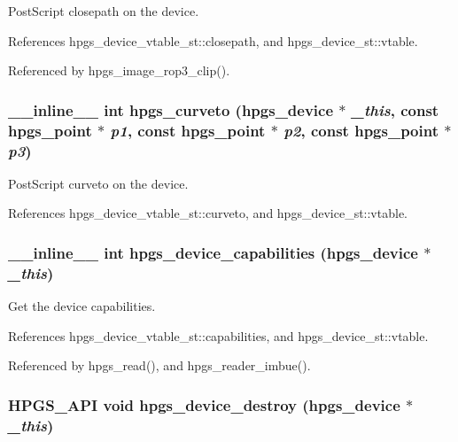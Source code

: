 PostScript closepath on the device. 

References hpgs\_\-device\_\-vtable\_\-st::closepath, and hpgs\_\-device\_\-st::vtable.

Referenced by hpgs\_\-image\_\-rop3\_\-clip().
\subsubsection[hpgs\_\-curveto]{\setlength{\rightskip}{0pt plus 5cm}\_\-\_\-inline\_\-\_\- int hpgs\_\-curveto ({\bf hpgs\_\-device} $\ast$ {\em \_\-this}, \/  const {\bf hpgs\_\-point} $\ast$ {\em p1}, \/  const {\bf hpgs\_\-point} $\ast$ {\em p2}, \/  const {\bf hpgs\_\-point} $\ast$ {\em p3})\hspace{0.3cm}{\tt  [static]}}\label{group__device_ge9c2bf3ad746f0db9b981cfb51254001}


PostScript curveto on the device. 

References hpgs\_\-device\_\-vtable\_\-st::curveto, and hpgs\_\-device\_\-st::vtable.
\subsubsection[hpgs\_\-device\_\-capabilities]{\setlength{\rightskip}{0pt plus 5cm}\_\-\_\-inline\_\-\_\- int hpgs\_\-device\_\-capabilities ({\bf hpgs\_\-device} $\ast$ {\em \_\-this})\hspace{0.3cm}{\tt  [static]}}\label{group__device_ged7b6320c336ec035a00ea176329978f}


Get the device capabilities. 

References hpgs\_\-device\_\-vtable\_\-st::capabilities, and hpgs\_\-device\_\-st::vtable.

Referenced by hpgs\_\-read(), and hpgs\_\-reader\_\-imbue().
\subsubsection[hpgs\_\-device\_\-destroy]{\setlength{\rightskip}{0pt plus 5cm}HPGS\_\-API void hpgs\_\-device\_\-destroy ({\bf hpgs\_\-device} $\ast$ {\em \_\-this})}\label{group__device_g9e5033cc99679c854402df0157e0eb82}


